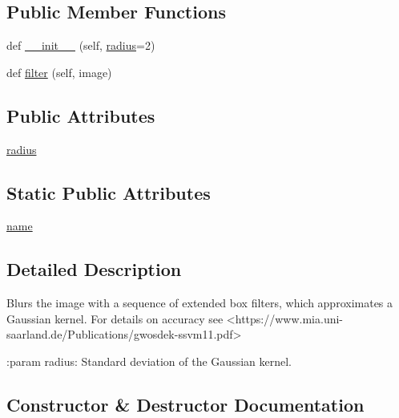 \subsection*{Public Member Functions}
\begin{DoxyCompactItemize}
\item 
def \hyperlink{classPIL_1_1ImageFilter_1_1GaussianBlur_a9af502fe296b10d4ad23652b367368e0}{\+\_\+\+\_\+init\+\_\+\+\_\+} (self, \hyperlink{classPIL_1_1ImageFilter_1_1GaussianBlur_a6ea73d1293ef5c4a5053c34a304a806b}{radius}=2)
\item 
def \hyperlink{classPIL_1_1ImageFilter_1_1GaussianBlur_ac21a4eafda9870a2f79e0498a7230bb8}{filter} (self, image)
\end{DoxyCompactItemize}
\subsection*{Public Attributes}
\begin{DoxyCompactItemize}
\item 
\hyperlink{classPIL_1_1ImageFilter_1_1GaussianBlur_a6ea73d1293ef5c4a5053c34a304a806b}{radius}
\end{DoxyCompactItemize}
\subsection*{Static Public Attributes}
\begin{DoxyCompactItemize}
\item 
\hyperlink{classPIL_1_1ImageFilter_1_1GaussianBlur_aea8d6995aa56569d3a74d7f4a54ed8dc}{name}
\end{DoxyCompactItemize}


\subsection{Detailed Description}
\begin{DoxyVerb}Blurs the image with a sequence of extended box filters, which
approximates a Gaussian kernel. For details on accuracy see
<https://www.mia.uni-saarland.de/Publications/gwosdek-ssvm11.pdf>

:param radius: Standard deviation of the Gaussian kernel.
\end{DoxyVerb}
 

\subsection{Constructor \& Destructor Documentation}
\mbox{\label{classPIL_1_1ImageFilter_1_1GaussianBlur_a9af502fe296b10d4ad23652b367368e0}} 
